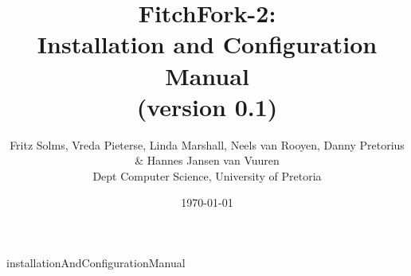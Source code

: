 \documentclass[titlepage]{article}
\title{FitchFork-2: \\ Installation and Configuration Manual \\
          (version 0.1)}
\author{Fritz Solms, Vreda Pieterse, Linda Marshall, Neels van Rooyen, Danny Pretorius \& Hannes Jansen van Vuuren \\ Dept Computer Science, University of Pretoria}
\date{\today}
\begin{document}
\maketitle

\tableofcontents

\newpage

{installationAndConfigurationManual}
\end{document}
